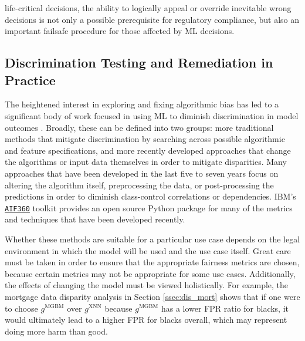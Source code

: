 \documentclass[information,article,submit,moreauthors,pdftex]{definitions/mdpi}
\begin{document}
life-critical decisions, the ability to logically appeal or override inevitable wrong decisions is not only a possible prerequisite for regulatory compliance, but also an important failsafe procedure for those affected by ML decisions.  

\subsection{Discrimination Testing and Remediation in Practice}\label{ssec:disc_rem}

The heightened interest in exploring and fixing algorithmic bias has led to a significant body of work focused in using ML to diminish discrimination in model outcomes \cite{friedler2019comparative}. Broadly, these can be defined into two groups: more traditional methods that mitigate discrimination by searching across possible algorithmic and feature specifications, and more recently developed approaches that change the algorithms or input data themselves in order to mitigate disparities. Many approaches that have been developed in the last five to seven years focus on altering the algorithm itself, preprocessing the data, or post-processing the predictions in order to diminish class-control correlations or dependencies. IBM’s \href{http://aif360.mybluemix.net/}{\texttt{AIF360}} toolkit provides an open source Python package for many of the metrics and techniques that have been developed recently.

Whether these methods are suitable for a particular use case depends on the legal environment in which the model will be used and the use case itself.  Great care must be taken in order to ensure that the appropriate fairness metrics are chosen, because certain metrics may not be appropriate for some use cases. Additionally, the effects of changing the model must be viewed holistically.  For example, the mortgage data disparity analysis in Section \ref{ssec:dis_mort} shows that if one were to choose $g^\text{MGBM}$ over $g^\text{XNN}$ because $g^\text{MGBM}$ has a lower FPR ratio for blacks, it would ultimately lead to a higher FPR for blacks overall, which may represent doing more harm than good.
\end{document}

